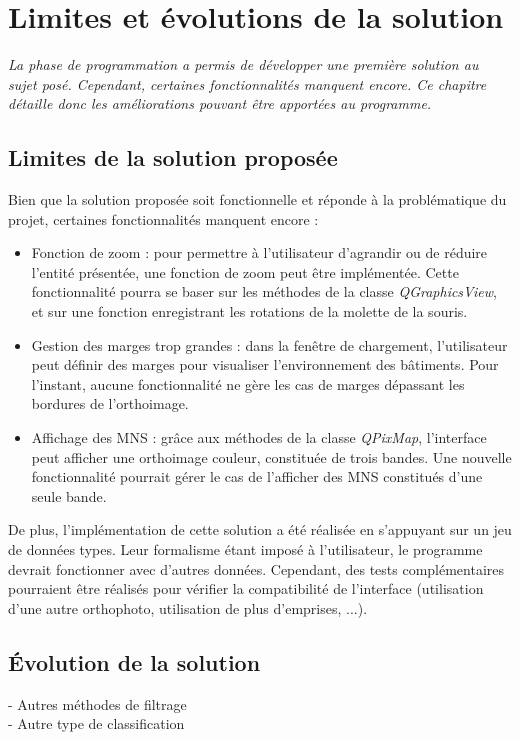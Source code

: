 \chapter[Limites et évolutions de la solution]{Limites et évolutions de la solution}

\textit{La phase de programmation a permis de développer une première solution au sujet posé. Cependant, certaines fonctionnalités manquent encore. Ce chapitre détaille donc les améliorations pouvant être apportées au programme.}

\section{Limites de la solution proposée}

Bien que la solution proposée soit fonctionnelle et réponde à la problématique du projet, certaines fonctionnalités manquent encore :
\begin{itemize}[label=$\rightarrow$]
	\item Fonction de zoom : pour permettre à l'utilisateur d'agrandir ou de réduire l'entité présentée, une fonction de zoom peut être implémentée. Cette fonctionnalité pourra se baser sur les méthodes de la classe \textit{QGraphicsView}, et sur une fonction enregistrant les rotations de la molette de la souris.
	\item Gestion des marges trop grandes : dans la fenêtre de chargement, l'utilisateur peut définir des marges pour visualiser l'environnement des bâtiments. Pour l'instant, aucune fonctionnalité ne gère les cas de marges dépassant les bordures de l'orthoimage.
	\item Affichage des MNS : grâce aux méthodes de la classe \textit{QPixMap}, l'interface peut afficher une orthoimage couleur, constituée de trois bandes. Une nouvelle fonctionnalité pourrait gérer le cas de l'afficher des MNS constitués d'une seule bande. \\
\end{itemize}

De plus, l'implémentation de cette solution a été réalisée en s'appuyant sur un jeu de données types. Leur formalisme étant imposé à l'utilisateur, le programme devrait fonctionner avec d'autres données. Cependant, des tests complémentaires pourraient être réalisés pour vérifier la compatibilité de l'interface (utilisation d'une autre orthophoto, utilisation de plus d'emprises, ...).


\section{Évolution de la solution}

- Autres méthodes de filtrage\\
- Autre type de classification\\

